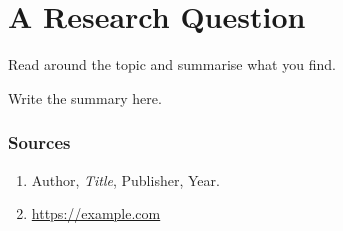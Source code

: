 \section{A Research Question }

\begin{question}
    Read around the topic and summarise what you find.
\end{question}

\begin{answer}
    Write the summary here.

    \subsubsection{Sources}

    \begin{enumerate}
        \item Author, \textit{Title}, Publisher, Year.
        \item \url{https://example.com}
    \end{enumerate}
\end{answer}
